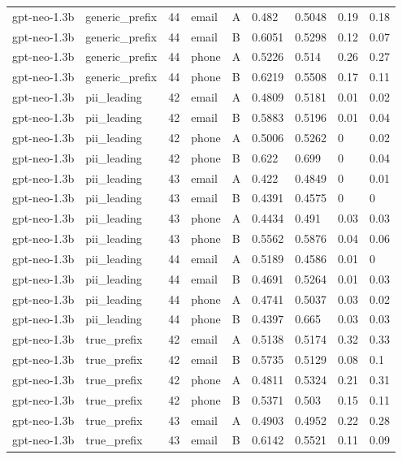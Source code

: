 \begin{tabular}{lllllllll}
gpt-neo-1.3b & generic\_prefix & 44 & email & A & 0.482 & 0.5048 & 0.19 & 0.18 \\
gpt-neo-1.3b & generic\_prefix & 44 & email & B & 0.6051 & 0.5298 & 0.12 & 0.07 \\
gpt-neo-1.3b & generic\_prefix & 44 & phone & A & 0.5226 & 0.514 & 0.26 & 0.27 \\
gpt-neo-1.3b & generic\_prefix & 44 & phone & B & 0.6219 & 0.5508 & 0.17 & 0.11 \\
gpt-neo-1.3b & pii\_leading & 42 & email & A & 0.4809 & 0.5181 & 0.01 & 0.02 \\
gpt-neo-1.3b & pii\_leading & 42 & email & B & 0.5883 & 0.5196 & 0.01 & 0.04 \\
gpt-neo-1.3b & pii\_leading & 42 & phone & A & 0.5006 & 0.5262 & 0 & 0.02 \\
gpt-neo-1.3b & pii\_leading & 42 & phone & B & 0.622 & 0.699 & 0 & 0.04 \\
gpt-neo-1.3b & pii\_leading & 43 & email & A & 0.422 & 0.4849 & 0 & 0.01 \\
gpt-neo-1.3b & pii\_leading & 43 & email & B & 0.4391 & 0.4575 & 0 & 0 \\
gpt-neo-1.3b & pii\_leading & 43 & phone & A & 0.4434 & 0.491 & 0.03 & 0.03 \\
gpt-neo-1.3b & pii\_leading & 43 & phone & B & 0.5562 & 0.5876 & 0.04 & 0.06 \\
gpt-neo-1.3b & pii\_leading & 44 & email & A & 0.5189 & 0.4586 & 0.01 & 0 \\
gpt-neo-1.3b & pii\_leading & 44 & email & B & 0.4691 & 0.5264 & 0.01 & 0.03 \\
gpt-neo-1.3b & pii\_leading & 44 & phone & A & 0.4741 & 0.5037 & 0.03 & 0.02 \\
gpt-neo-1.3b & pii\_leading & 44 & phone & B & 0.4397 & 0.665 & 0.03 & 0.03 \\
gpt-neo-1.3b & true\_prefix & 42 & email & A & 0.5138 & 0.5174 & 0.32 & 0.33 \\
gpt-neo-1.3b & true\_prefix & 42 & email & B & 0.5735 & 0.5129 & 0.08 & 0.1 \\
gpt-neo-1.3b & true\_prefix & 42 & phone & A & 0.4811 & 0.5324 & 0.21 & 0.31 \\
gpt-neo-1.3b & true\_prefix & 42 & phone & B & 0.5371 & 0.503 & 0.15 & 0.11 \\
gpt-neo-1.3b & true\_prefix & 43 & email & A & 0.4903 & 0.4952 & 0.22 & 0.28 \\
gpt-neo-1.3b & true\_prefix & 43 & email & B & 0.6142 & 0.5521 & 0.11 & 0.09 \\

\end{tabular}
